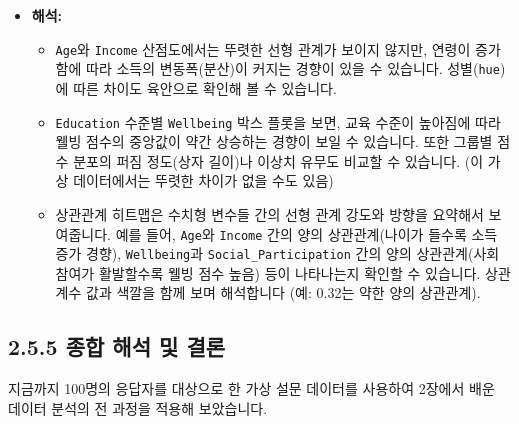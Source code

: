 \documentclass[
  letterpaper,
]{book}
\providecommand{\tightlist}{%
  \setlength{\itemsep}{0pt}\setlength{\parskip}{0pt}}
\begin{document}
\begin{itemize}
\tightlist
\item
  \textbf{해석:}

  \begin{itemize}
  \tightlist
  \item
    \texttt{Age}와 \texttt{Income} 산점도에서는 뚜렷한 선형 관계가
    보이지 않지만, 연령이 증가함에 따라 소득의 변동폭(분산)이 커지는
    경향이 있을 수 있습니다. 성별(\texttt{hue})에 따른 차이도 육안으로
    확인해 볼 수 있습니다.
  \item
    \texttt{Education} 수준별 \texttt{Wellbeing} 박스 플롯을 보면, 교육
    수준이 높아짐에 따라 웰빙 점수의 중앙값이 약간 상승하는 경향이 보일
    수 있습니다. 또한 그룹별 점수 분포의 퍼짐 정도(상자 길이)나 이상치
    유무도 비교할 수 있습니다. (이 가상 데이터에서는 뚜렷한 차이가 없을
    수도 있음)
  \item
    상관관계 히트맵은 수치형 변수들 간의 선형 관계 강도와 방향을
    요약해서 보여줍니다. 예를 들어, \texttt{Age}와 \texttt{Income} 간의
    양의 상관관계(나이가 들수록 소득 증가 경향), \texttt{Wellbeing}과
    \texttt{Social\_Participation} 간의 양의 상관관계(사회 참여가
    활발할수록 웰빙 점수 높음) 등이 나타나는지 확인할 수 있습니다.
    상관계수 값과 색깔을 함께 보며 해석합니다 (예: 0.32는 약한 양의
    상관관계).
  \end{itemize}
\end{itemize}

\subsection{2.5.5 종합 해석 및
결론}\label{uxc885uxd569-uxd574uxc11d-uxbc0f-uxacb0uxb860}

지금까지 100명의 응답자를 대상으로 한 가상 설문 데이터를 사용하여
2장에서 배운 데이터 분석의 전 과정을 적용해 보았습니다.
\end{document}
